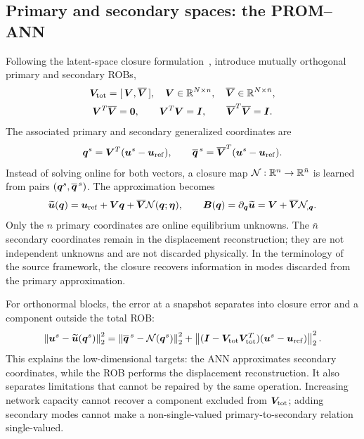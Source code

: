 \subsection{Primary and secondary spaces: the PROM--ANN}
Following the latent-space closure formulation~\cite{barnett2023,aresdeparga2026nonlinear}, introduce mutually orthogonal primary and secondary ROBs,
\begin{gather}
 \bm V_{\rm tot}=[\,\bm V,\overline{\bm V}\,],\quad
 \bm V\in\mathbb R^{N\times n},\quad
 \overline{\bm V}\in\mathbb R^{N\times\bar n},\\
 \bm V^T\overline{\bm V}=\bm0,\qquad
 \bm V^T\bm V=\bm I,\qquad
 \overline{\bm V}^T\overline{\bm V}=\bm I.
 \label{eq:partitioned_rob}
\end{gather}
The associated primary and secondary generalized coordinates are
\begin{equation}
 \bm q^s=\bm V^T(\bm u^s-\bm u_{\rm ref}),\qquad
 \overline{\bm q}^{\,s}=\overline{\bm V}^T(\bm u^s-\bm u_{\rm ref}).
\end{equation}
Instead of solving online for both vectors, a closure map
$\mathcal N:\mathbb R^n\to\mathbb R^{\bar n}$ is learned from pairs
$(\bm q^s,\overline{\bm q}^{\,s})$. The approximation becomes
\begin{equation}
 \widetilde{\bm u}(\bm q)
 =\bm u_{\rm ref}+\bm V\bm q+
       \overline{\bm V}\mathcal N(\bm q;\bm\eta),
 \qquad
 \bm B(\bm q)=\partial_{\bm q}\widetilde{\bm u}
       =\bm V+\overline{\bm V}\mathcal N_{,\bm q}.
 \label{eq:prom_ann}
\end{equation}
Only the $n$ primary coordinates are online equilibrium unknowns. The $\bar n$ secondary coordinates remain in the displacement reconstruction; they are not independent unknowns and are not discarded physically. In the terminology of the source framework, the closure recovers information in modes discarded from the primary approximation.

For orthonormal blocks, the error at a snapshot separates into closure error and a component outside the total ROB:
\begin{equation}
 \left\|\bm u^s-\widetilde{\bm u}(\bm q^s)\right\|_2^2
 =
 \left\|\overline{\bm q}^{\,s}-\mathcal N(\bm q^s)\right\|_2^2
 +\left\|(\bm I-\bm V_{\rm tot}\bm V_{\rm tot}^T)
             (\bm u^s-\bm u_{\rm ref})\right\|_2^2.
 \label{eq:closure_error_split}
\end{equation}
This explains the low-dimensional targets: the ANN approximates secondary coordinates, while the ROB performs the displacement reconstruction. It also separates limitations that cannot be repaired by the same operation. Increasing network capacity cannot recover a component excluded from $\bm V_{\rm tot}$; adding secondary modes cannot make a non-single-valued primary-to-secondary relation single-valued.

